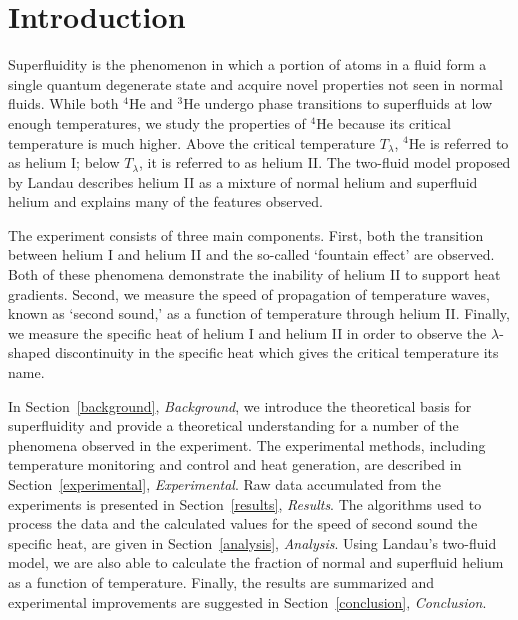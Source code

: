 
\section{Introduction}\label{introduction}

Superfluidity is the phenomenon in which a portion of atoms in a fluid form a single quantum degenerate state and acquire novel properties not seen in normal fluids. While both $^{4}$He and $^{3}$He undergo phase transitions to superfluids at low enough temperatures, we study the properties of $^{4}$He because its critical temperature is much higher. Above the critical temperature $T_{\lambda}$, $^{4}$He is referred to as helium I; below $T_{\lambda}$, it is referred to as helium II. The two-fluid model proposed by Landau \cite{landau} describes helium II as a mixture of normal helium and superfluid helium and explains many of the features observed.

The experiment consists of three main components. First, both the transition between helium I and helium II and the so-called `fountain effect' are observed. Both of these phenomena demonstrate the inability of helium II to support heat gradients. Second, we measure the speed of propagation of temperature waves, known as `second sound,'  as a function of temperature through helium II. Finally, we measure the specific heat of helium I and helium II in order to observe the $\lambda$-shaped discontinuity in the specific heat which gives the critical temperature its name.

In Section~\ref{background}, \emph{Background}, we introduce the theoretical basis for superfluidity and provide a theoretical understanding for a number of the phenomena observed in the experiment. The experimental methods, including temperature monitoring and control and heat generation, are described in Section~\ref{experimental}, \emph{Experimental}. Raw data accumulated from the experiments is presented in Section~\ref{results}, \emph{Results}. The algorithms used to process the data and the calculated values for the speed of second sound the specific heat, are given in Section~\ref{analysis}, \emph{Analysis}. Using Landau's two-fluid model, we are also able to calculate the fraction of normal and superfluid helium as a function of temperature. Finally, the results are summarized and experimental improvements are suggested in Section~\ref{conclusion}, \emph{Conclusion}.